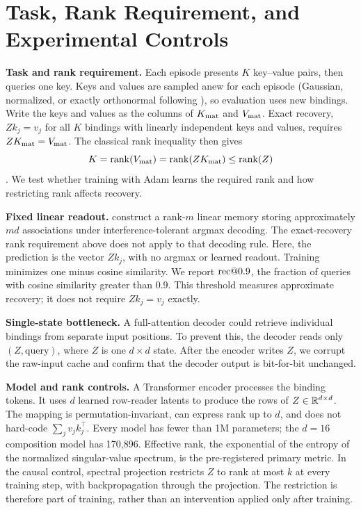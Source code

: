\section{Task, Rank Requirement, and Experimental Controls}
\label{sec:setup}

\textbf{Task and rank requirement.} Each episode presents $K$
key--value pairs, then queries one key. Keys and values are sampled
anew for each episode (Gaussian, normalized, or exactly orthonormal
following \citealp{mezzadri2007random}), so evaluation uses new
bindings. Write the keys and values as the columns of $K_{\mathrm{mat}}$ and
$V_{\mathrm{mat}}$. Exact recovery, $Z k_j = v_j$ for all $K$ bindings with
linearly independent keys and values, requires $Z K_{\mathrm{mat}} = V_{\mathrm{mat}}$.
The classical rank inequality then gives
\[
K = \operatorname{rank}(V_{\mathrm{mat}}) = \operatorname{rank}(Z K_{\mathrm{mat}}) \leq \operatorname{rank}(Z)
\]
\citep{kohonen1972correlation,anderson1972simple}.
We test whether training with Adam learns the required rank and how
restricting rank affects recovery.

\textbf{Fixed linear readout.}
\citet{nichani2025factual} construct a rank-$m$ linear memory storing
approximately $md$ associations under interference-tolerant argmax
decoding. The exact-recovery rank requirement above does not apply to
that decoding rule. Here, the prediction is the vector $Z k_j$, with
no argmax or learned readout. Training minimizes one minus cosine
similarity. We report $\mathrm{rec}@0.9$, the fraction of queries with
cosine similarity greater than 0.9. This threshold measures approximate
recovery; it does not require $Z k_j = v_j$ exactly.

\textbf{Single-state bottleneck.}
A full-attention decoder could retrieve individual bindings from
separate input positions. To prevent this, the decoder reads only
$(Z, \mathrm{query})$, where $Z$ is one $d \times d$ state. After the
encoder writes $Z$, we corrupt the raw-input cache and confirm that
the decoder output is bit-for-bit unchanged.

\textbf{Model and rank controls.} A Transformer encoder processes the
binding tokens. It uses $d$ learned row-reader latents to produce the
rows of $Z \in \mathbb{R}^{d \times d}$. The mapping is permutation-invariant,
can express rank up to $d$, and does not hard-code
$\sum_j v_j k_j^\top$. Every model has fewer than 1M parameters; the
$d = 16$ composition model has 170{,}896.
Effective rank, the exponential of the entropy of the normalized
singular-value spectrum, is the pre-registered primary metric.
In the causal control, spectral projection restricts $Z$ to rank at
most $k$ at every training step, with backpropagation through the
projection. The restriction is therefore part of training, rather
than an intervention applied only after training.
